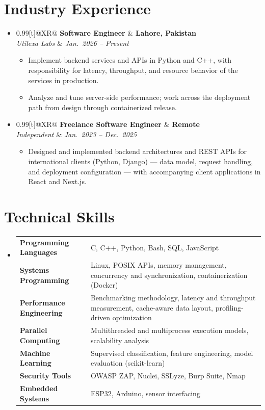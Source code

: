 \documentclass[letterpaper,10pt]{article}
\makeatletter
\newcommand{\cvitem}[4]{%
	\Needspace*{5\baselineskip}\vspace{1pt}\item[]
	\begin{tabularx}{0.99\textwidth}[t]{@{}XR@{}}
		\textbf{#1} & \textbf{\small #2} \\
		\textit{\small #3} & \textit{\small #4} \\
	\end{tabularx}\vspace{-5pt}
}
\newcommand{\cvbullet}[1]{\item\small{#1 \vspace{-2pt}}}
\newcommand{\cvlist}{\begin{itemize}[leftmargin=0.16in,label=$\bullet$,topsep=2pt,itemsep=1pt,parsep=0pt]}
\newcommand{\cvlistend}{\end{itemize}\vspace{-4pt}}
\newcommand{\cvsectionlist}{\begin{itemize}[leftmargin=0in,label={}]}
\newcommand{\cvsectionlistend}{\end{itemize}}
\makeatother
\begin{document}
	\section{Industry Experience}
	\cvsectionlist
	
	\cvitem
	{Software Engineer}{Lahore, Pakistan}
	{Utilexa Labs}{Jan.\ 2026 -- Present}
	\cvlist
	\cvbullet{Implement backend services and APIs in Python and C++, with responsibility for latency, throughput, and resource behavior of the services in production.}
	\cvbullet{Analyze and tune server-side performance; work across the deployment path from design through containerized release.}
	\cvlistend
	
	\cvitem
	{Freelance Software Engineer}{Remote}
	{Independent}{Jan.\ 2023 -- Dec.\ 2025}
	\cvlist
	\cvbullet{Designed and implemented backend architectures and REST APIs for international clients (Python, Django) --- data model, request handling, and deployment configuration --- with accompanying client applications in React and Next.js.}
	\cvlistend
	
	\cvsectionlistend
	
	\section{Technical Skills}
	\cvsectionlist
	\item[]
	\small{
		\begin{tabularx}{0.99\textwidth}{@{}>{\raggedright\arraybackslash\bfseries}p{1.75in} X@{}}
			Programming Languages & C, C++, Python, Bash, SQL, JavaScript \\
			Systems Programming & Linux, POSIX APIs, memory management, concurrency and synchronization, containerization (Docker) \\
			Performance Engineering & Benchmarking methodology, latency and throughput measurement, cache-aware data layout, profiling-driven optimization \\
			Parallel Computing & Multithreaded and multiprocess execution models, scalability analysis \\
			Machine Learning & Supervised classification, feature engineering, model evaluation (scikit-learn) \\
			Security Tools & OWASP ZAP, Nuclei, SSLyze, Burp Suite, Nmap \\
			Embedded Systems & ESP32, Arduino, sensor interfacing \\
			
		\end{tabularx}
	}
	\cvsectionlistend
	
\end{document}
